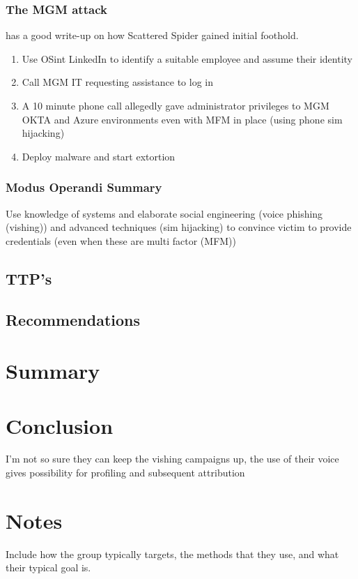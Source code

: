 \documentclass[
	letterpaper, %
	10pt, %
	unnumberedsections, %
	twoside, %
]{APAAssignment}
\begin{document}
\subsubsection{The MGM attack} \cite{UHonMGM-ALPHV} has a good write-up on how Scattered Spider gained initial foothold.

\begin{enumerate}
	\item Use OSint LinkedIn to identify a suitable employee and assume their identity
	\item Call MGM IT requesting assistance to log in
	\item A 10 minute phone call allegedly gave administrator privileges to MGM OKTA and Azure environments even with MFM in place (using phone sim hijacking)
	\item Deploy malware and start extortion
\end{enumerate}

\subsubsection{Modus Operandi Summary} Use knowledge of systems and elaborate social engineering (voice phishing (vishing)) and advanced techniques  (sim hijacking) to convince victim to provide credentials (even when these are multi factor (MFM))

\subsection{TTP's}

\subsection{Recommendations}


\section{Summary}

\section{Conclusion}
I'm not so sure they can keep the vishing campaigns up, the use of their voice gives possibility for profiling and subsequent attribution



\section{Notes}
Include how the group typically targets, the methods that they use, and what their typical goal is.
\end{document}
